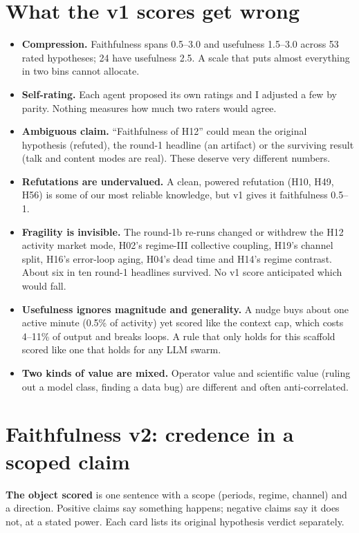 \documentclass[aps,pre,reprint,10pt,nofootinbib]{revtex4-2}
\begin{document}
\section{What the v1 scores get wrong}
\begin{itemize}
\item \textbf{Compression.} Faithfulness spans 0.5--3.0 and usefulness 1.5--3.0 across 53 rated hypotheses; 24 have usefulness 2.5. A scale that puts almost everything in two bins cannot allocate.
\item \textbf{Self-rating.} Each agent proposed its own ratings and I adjusted a few by parity. Nothing measures how much two raters would agree.
\item \textbf{Ambiguous claim.} ``Faithfulness of H12'' could mean the original hypothesis (refuted), the round-1 headline (an artifact) or the surviving result (talk and content modes are real). These deserve very different numbers.
\item \textbf{Refutations are undervalued.} A clean, powered refutation (H10, H49, H56) is some of our most reliable knowledge, but v1 gives it faithfulness 0.5--1.
\item \textbf{Fragility is invisible.} The round-1b re-runs changed or withdrew the H12 activity market mode, H02's regime-III collective coupling, H19's channel split, H16's error-loop aging, H04's dead time and H14's regime contrast. About six in ten round-1 headlines survived. No v1 score anticipated which would fall.
\item \textbf{Usefulness ignores magnitude and generality.} A nudge buys about one active minute (0.5\% of activity) yet scored like the context cap, which costs 4--11\% of output and breaks loops. A rule that only holds for this scaffold scored like one that holds for any LLM swarm.
\item \textbf{Two kinds of value are mixed.} Operator value and scientific value (ruling out a model class, finding a data bug) are different and often anti-correlated.
\end{itemize}

\section{Faithfulness v2: credence in a scoped claim}
\textbf{The object scored} is one sentence with a scope (periods, regime, channel) and a direction. Positive claims say something happens; negative claims say it does not, at a stated power. Each card lists its original hypothesis verdict separately.
\end{document}
